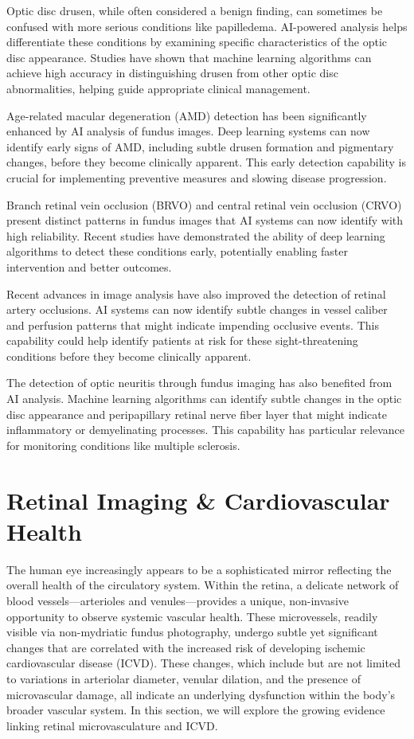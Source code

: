 \documentclass[
  Letterpaper,
]{scrbook}
\begin{document}
Optic disc drusen, while often considered a benign finding, can
sometimes be confused with more serious conditions like papilledema.
AI-powered analysis helps differentiate these conditions by examining
specific characteristics of the optic disc appearance. Studies have
shown that machine learning algorithms can achieve high accuracy in
distinguishing drusen from other optic disc abnormalities, helping guide
appropriate clinical management.

Age-related macular degeneration (AMD) detection has been significantly
enhanced by AI analysis of fundus images. Deep learning systems can now
identify early signs of AMD, including subtle drusen formation and
pigmentary changes, before they become clinically apparent. This early
detection capability is crucial for implementing preventive measures and
slowing disease progression.

Branch retinal vein occlusion (BRVO) and central retinal vein occlusion
(CRVO) present distinct patterns in fundus images that AI systems can
now identify with high reliability. Recent studies have demonstrated the
ability of deep learning algorithms to detect these conditions early,
potentially enabling faster intervention and better outcomes.

Recent advances in image analysis have also improved the detection of
retinal artery occlusions. AI systems can now identify subtle changes in
vessel caliber and perfusion patterns that might indicate impending
occlusive events. This capability could help identify patients at risk
for these sight-threatening conditions before they become clinically
apparent.

The detection of optic neuritis through fundus imaging has also
benefited from AI analysis. Machine learning algorithms can identify
subtle changes in the optic disc appearance and peripapillary retinal
nerve fiber layer that might indicate inflammatory or demyelinating
processes. This capability has particular relevance for monitoring
conditions like multiple sclerosis.

\section{Retinal Imaging \& Cardiovascular
Health}\label{retinal-imaging-cardiovascular-health}

The human eye increasingly appears to be a sophisticated mirror
reflecting the overall health of the circulatory system. Within the
retina, a delicate network of blood vessels---arterioles and
venules---provides a unique, non-invasive opportunity to observe
systemic vascular health. These microvessels, readily visible via
non-mydriatic fundus photography, undergo subtle yet significant changes
that are correlated with the increased risk of developing ischemic
cardiovascular disease (ICVD). These changes, which include but are not
limited to variations in arteriolar diameter, venular dilation, and the
presence of microvascular damage, all indicate an underlying dysfunction
within the body's broader vascular system. In this section, we will
explore the growing evidence linking retinal microvasculature and ICVD.
\end{document}
